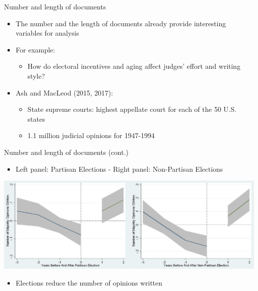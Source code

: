 \documentclass[english]{beamer}
\begin{document}
\begin{frame}{Number and length of documents}
\begin{itemize}
\setlength{\itemsep}{1.2em}
\setlength{\itemindent}{-0.5em}
\item The number and the length of documents already provide interesting variables for analysis
\item For example:
\vspace{5pt}
\begin{itemize}
\setlength{\itemsep}{1.5em}
\setlength{\itemindent}{-1.3em}
\item How do electoral incentives and aging affect judges' effort and writing\\
\hspace{-12pt}style?
\end{itemize}
\item Ash and MacLeod (2015, 2017):
\vspace{5pt}
\begin{itemize}
\setlength{\itemsep}{0.5em}
\setlength{\itemindent}{-1.3em}
\item State supreme courts: highest appellate court for each of the 50 U.S.\\
\hspace{-12pt}states
\item 1.1 million judicial opinions for 1947-1994
\end{itemize}
\end{itemize}
\end{frame}

\begin{frame}{Number and length of documents (cont.)}
\begin{itemize}
\setlength{\itemsep}{1.2em}
\setlength{\itemindent}{-0.5em}
\item Left panel: Partisan Elections - Right panel: Non-Partisan Elections
\end{itemize}
\begin{center}
\includegraphics[scale=0.25]{Images/ash_macleod.png}
\end{center}
\begin{itemize}
\setlength{\itemsep}{1.2em}
\setlength{\itemindent}{-0.5em}
\item Elections reduce the number of opinions written
\end{itemize}
\end{frame}
\end{document}
